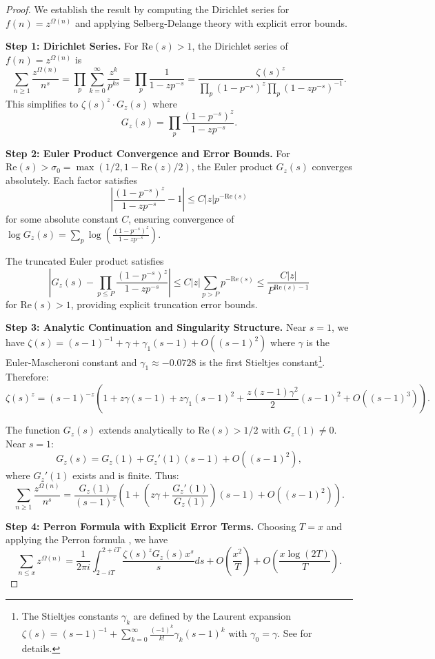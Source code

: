 \documentclass[12pt]{article}
\theoremstyle{definition}
\theoremstyle{remark}
\begin{document}
\begin{proof}
We establish the result by computing the Dirichlet series for $f(n) = z^{\Omega(n)}$ and applying Selberg-Delange theory with explicit error bounds.

\noindent\textbf{Step 1: Dirichlet Series.}
For $\mathrm{Re}(s) > 1$, the Dirichlet series of $f(n) = z^{\Omega(n)}$ is
\[
\sum_{n \geq 1}\frac{z^{\Omega(n)}}{n^s} = \prod_p \sum_{k=0}^\infty \frac{z^k}{p^{ks}} = \prod_p \frac{1}{1-zp^{-s}} = \frac{\zeta(s)^z}{\prod_p(1-p^{-s})^z \prod_p(1-zp^{-s})^{-1}}.
\]
This simplifies to $\zeta(s)^z \cdot G_z(s)$ where
\[
G_z(s) = \prod_{p} \frac{(1 - p^{-s})^z}{1 - zp^{-s}}.
\]

\noindent\textbf{Step 2: Euler Product Convergence and Error Bounds.}
For $\mathrm{Re}(s) > \sigma_0 = \max(1/2, 1 - \mathrm{Re}(z)/2)$, the Euler product $G_z(s)$ converges absolutely. Each factor satisfies
\[
\left|\frac{(1 - p^{-s})^z}{1 - zp^{-s}} - 1\right| \leq C|z|p^{-\mathrm{Re}(s)}
\]
for some absolute constant $C$, ensuring convergence of $\log G_z(s) = \sum_p \log\left(\frac{(1-p^{-s})^z}{1-zp^{-s}}\right)$.

The truncated Euler product satisfies
\[
\left|G_z(s) - \prod_{p \leq P} \frac{(1 - p^{-s})^z}{1 - zp^{-s}}\right| \leq C|z|\sum_{p > P} p^{-\mathrm{Re}(s)} \leq \frac{C|z|}{P^{\mathrm{Re}(s)-1}}
\]
for $\mathrm{Re}(s) > 1$, providing explicit truncation error bounds.

\noindent\textbf{Step 3: Analytic Continuation and Singularity Structure.}
Near $s = 1$, we have $\zeta(s) = (s-1)^{-1} + \gamma + \gamma_1(s-1) + O((s-1)^2)$ where $\gamma$ is the Euler-Mascheroni constant and $\gamma_1 \approx -0.0728$ is the first Stieltjes constant\footnote{The Stieltjes constants $\gamma_k$ are defined by the Laurent expansion $\zeta(s) = (s-1)^{-1} + \sum_{k=0}^\infty \frac{(-1)^k}{k!}\gamma_k(s-1)^k$ with $\gamma_0 = \gamma$. See \cite{tenenbaum2015introduction} for details.}. Therefore:
\[
\zeta(s)^z = (s-1)^{-z}\left(1 + z\gamma(s-1) + z\gamma_1(s-1)^2 + \frac{z(z-1)\gamma^2}{2}(s-1)^2 + O((s-1)^3)\right).
\]

The function $G_z(s)$ extends analytically to $\mathrm{Re}(s) > 1/2$ with $G_z(1) \neq 0$. Near $s = 1$:
\[
G_z(s) = G_z(1) + G_z'(1)(s-1) + O((s-1)^2),
\]
where $G_z'(1)$ exists and is finite. Thus:
\[
\sum_{n \geq 1}\frac{z^{\Omega(n)}}{n^s} = \frac{G_z(1)}{(s-1)^z}\left(1 + \left(z\gamma + \frac{G_z'(1)}{G_z(1)}\right)(s-1) + O((s-1)^2)\right).
\]

\noindent\textbf{Step 4: Perron Formula with Explicit Error Terms.}
Choosing $T = x$ and applying the Perron formula \cite{tenenbaum2015introduction}, we have
\[
\sum_{n \leq x} z^{\Omega(n)} = \frac{1}{2\pi i} \int_{2-iT}^{2+iT} \frac{\zeta(s)^z G_z(s) x^s}{s} ds + O\left(\frac{x^2}{T}\right) + O\left(\frac{x \log(2T)}{T}\right).
\]


\end{proof}
\end{document}
